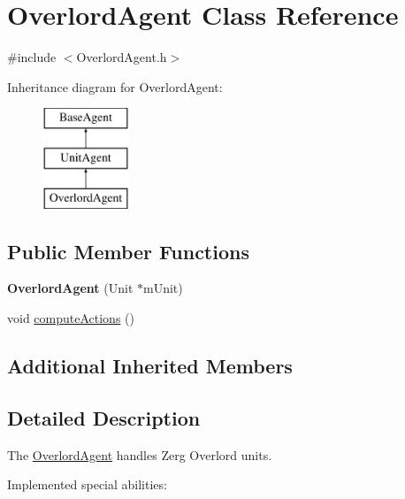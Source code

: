 \hypertarget{class_overlord_agent}{\section{Overlord\-Agent Class Reference}
\label{class_overlord_agent}
}


{\ttfamily \#include $<$Overlord\-Agent.\-h$>$}

Inheritance diagram for Overlord\-Agent\-:\begin{figure}[H]
\begin{center}
\leavevmode
\includegraphics[height=3.000000cm]{class_overlord_agent}
\end{center}
\end{figure}
\subsection*{Public Member Functions}
\begin{DoxyCompactItemize}
\item 
\hypertarget{class_overlord_agent_ad2809c8a6efdc18d1d8b63650b6126e5}{{\bfseries Overlord\-Agent} (Unit $\ast$m\-Unit)}\label{class_overlord_agent_ad2809c8a6efdc18d1d8b63650b6126e5}

\item 
void \hyperlink{class_overlord_agent_a8669fde4071d78fe759dccabbedd9cbd}{compute\-Actions} ()
\end{DoxyCompactItemize}
\subsection*{Additional Inherited Members}


\subsection{Detailed Description}
The \hyperlink{class_overlord_agent}{Overlord\-Agent} handles Zerg Overlord units.

Implemented special abilities\-:
\begin{DoxyItemize}
\item 
\end{DoxyItemize}

